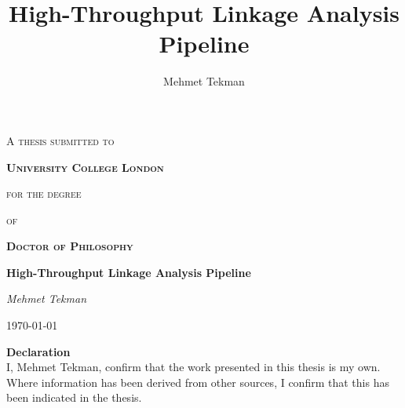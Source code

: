 \documentclass[11pt]{report} %
\author{Mehmet Tekman}
\title{High-Throughput Linkage Analysis Pipeline}
\begin{document}
\begin{spacing}{1}
\begin{titlepage}
	\centering
	{\scshape\Large A thesis submitted to\par}
	{\scshape\LARGE\bf University College London\par}
	{\scshape\Large for the degree\par}
	{\scshape\Large of\par}
	{\scshape\LARGE\bf Doctor of Philosophy\par}
	\vspace{1cm}

	\vspace{1.5cm}
	{\huge\bfseries High-Throughput Linkage Analysis Pipeline\par}
	\vspace{2cm}
	{\Large\itshape Mehmet Tekman\par}
	\vfill

	{\large \today\par}
\end{titlepage}

\pagebreak
{\noindent \bf Declaration}\\
{\noindent I, Mehmet Tekman, confirm that the work presented in this thesis is my own. Where information has been derived from other sources, I confirm that this has been indicated in the thesis.}
\pagebreak




\tableofcontents
\end{spacing}



\pagebreak





%



%
%
\end{document}
